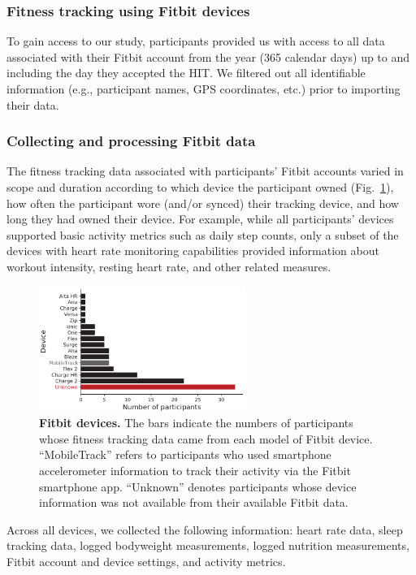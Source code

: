 \documentclass[10pt]{article}
\begin{document}
\subsubsection*{Fitness tracking using Fitbit devices}
To gain access to our study, participants provided us with access to
all data associated with their Fitbit account from the year (365
calendar days) up to and including the day they accepted the HIT.  We
filtered out all identifiable information (e.g., participant names,
GPS coordinates, etc.) prior to importing their data.

\subsubsection*{Collecting and processing Fitbit data}

The fitness tracking data associated with participants' Fitbit
accounts varied in scope and duration according to which device the
participant owned (Fig.~\ref{fig:devices}), how often the participant
wore (and/or synced) their tracking device, and how long they had
owned their device.  For example, while all participants' devices
supported basic activity metrics such as daily step counts, only a
subset of the devices with heart rate monitoring capabilities provided
information about workout intensity, resting heart rate, and other
related measures.

\begin{figure}[t]
\centering
\includegraphics[width=0.6\textwidth]{figs/devices}
\caption{\textbf{Fitbit devices.}  The bars indicate the numbers of
  participants whose fitness tracking data came from each model of
  Fitbit device.  ``MobileTrack'' refers to participants who used
  smartphone accelerometer information to track their activity via the
  Fitbit smartphone app.
  ``Unknown''  denotes participants whose device information was not
  available from their available Fitbit data.}
\label{fig:devices}
\end{figure}

Across all devices, we collected the following information: heart rate
data, sleep tracking data, logged bodyweight measurements, logged
nutrition measurements, Fitbit account and device settings, and
activity metrics.
\end{document}
